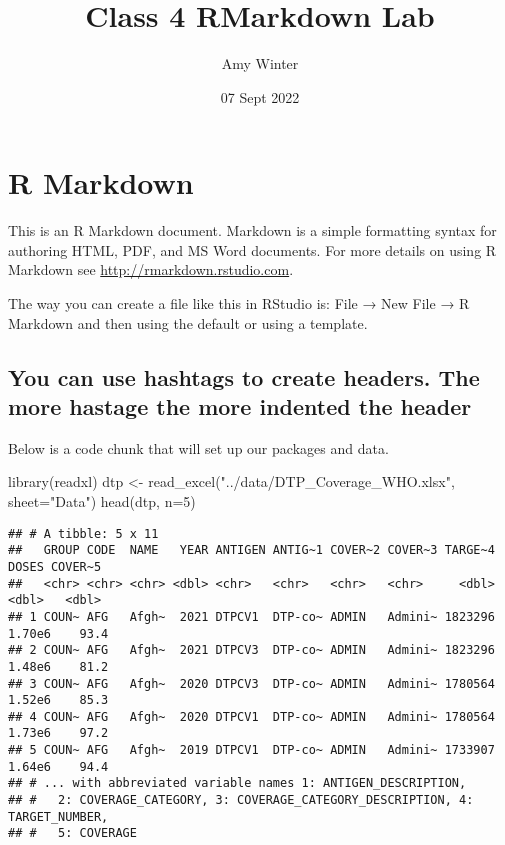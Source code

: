 \documentclass[
]{article}
\title{Class 4 RMarkdown Lab}
\author{Amy Winter}
\date{07 Sept 2022}
\newenvironment{Shaded}{\begin{snugshade}}{\end{snugshade}}
\newcommand{\AttributeTok}[1]{\textcolor[rgb]{0.77,0.63,0.00}{#1}}
\newcommand{\DecValTok}[1]{\textcolor[rgb]{0.00,0.00,0.81}{#1}}
\newcommand{\FunctionTok}[1]{\textcolor[rgb]{0.00,0.00,0.00}{#1}}
\newcommand{\NormalTok}[1]{#1}
\newcommand{\OtherTok}[1]{\textcolor[rgb]{0.56,0.35,0.01}{#1}}
\newcommand{\StringTok}[1]{\textcolor[rgb]{0.31,0.60,0.02}{#1}}
\begin{document}
\maketitle

\hypertarget{r-markdown}{%
\section{R Markdown}\label{r-markdown}}

This is an R Markdown document. Markdown is a simple formatting syntax
for authoring HTML, PDF, and MS Word documents. For more details on
using R Markdown see \url{http://rmarkdown.rstudio.com}.

The way you can create a file like this in RStudio is: File → New File →
R Markdown and then using the default or using a template.

\hypertarget{you-can-use-hashtags-to-create-headers.-the-more-hastage-the-more-indented-the-header}{%
\subsection{You can use hashtags to create headers. The more hastage the
more indented the
header}\label{you-can-use-hashtags-to-create-headers.-the-more-hastage-the-more-indented-the-header}}

Below is a code chunk that will set up our packages and data.

\begin{Shaded}
\begin{Highlighting}[]
\FunctionTok{library}\NormalTok{(readxl)}
\NormalTok{dtp }\OtherTok{\textless{}{-}} \FunctionTok{read\_excel}\NormalTok{(}\StringTok{"../data/DTP\_Coverage\_WHO.xlsx"}\NormalTok{, }\AttributeTok{sheet=}\StringTok{"Data"}\NormalTok{)}
\FunctionTok{head}\NormalTok{(dtp, }\AttributeTok{n=}\DecValTok{5}\NormalTok{)}
\end{Highlighting}
\end{Shaded}

\begin{verbatim}
## # A tibble: 5 x 11
##   GROUP CODE  NAME   YEAR ANTIGEN ANTIG~1 COVER~2 COVER~3 TARGE~4  DOSES COVER~5
##   <chr> <chr> <chr> <dbl> <chr>   <chr>   <chr>   <chr>     <dbl>  <dbl>   <dbl>
## 1 COUN~ AFG   Afgh~  2021 DTPCV1  DTP-co~ ADMIN   Admini~ 1823296 1.70e6    93.4
## 2 COUN~ AFG   Afgh~  2021 DTPCV3  DTP-co~ ADMIN   Admini~ 1823296 1.48e6    81.2
## 3 COUN~ AFG   Afgh~  2020 DTPCV3  DTP-co~ ADMIN   Admini~ 1780564 1.52e6    85.3
## 4 COUN~ AFG   Afgh~  2020 DTPCV1  DTP-co~ ADMIN   Admini~ 1780564 1.73e6    97.2
## 5 COUN~ AFG   Afgh~  2019 DTPCV1  DTP-co~ ADMIN   Admini~ 1733907 1.64e6    94.4
## # ... with abbreviated variable names 1: ANTIGEN_DESCRIPTION,
## #   2: COVERAGE_CATEGORY, 3: COVERAGE_CATEGORY_DESCRIPTION, 4: TARGET_NUMBER,
## #   5: COVERAGE
\end{verbatim}
\end{document}
